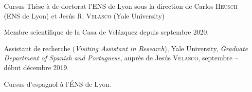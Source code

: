 









 \begin{rubric}{Cursus}
                                \entry*[2018-...]
                            Thèse à de doctorat l'ENS de Lyon sous la
                        direction de Carlos \textsc{Heusch} (ENS de Lyon) et
                        Jesús R. \textsc{Velasco} (Yale University)
                    
                                \hspace{-1cm}
                                \entry*
                            Membre scientifique de la Casa de Velázquez depuis
                        septembre 2020.
                    
                                \hspace{-1cm}
                                \entry*
                            Assistant de recherche (\textit{Visiting Assistant in
                        Research}), Yale University, \textit{Graduate Department
                        of Spanish and Portuguese}, auprès de Jesús
                        \textsc{Velasco}, septembre -- début décembre 2019.
                    
                    
                                \entry*[2013-2017]
                            Cursus d'espagnol à l'ÉNS de Lyon.
                    \end{rubric}





